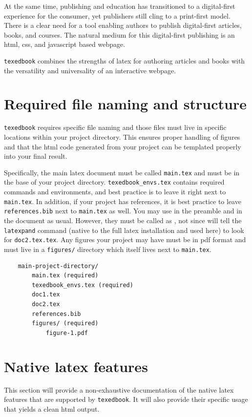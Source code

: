 \documentclass{article}
\begin{document}
At the same time, publishing and education has transitioned to a digital-first experience for the consumer, yet publishers still cling to a print-first model. There is a clear need for a tool enabling authors to publish digital-first articles, books, and courses. The natural medium for this digital-first publishing is an html, css, and javascript based webpage. 

\verb'texedbook' combines the strengths of latex for authoring articles and books with the versatility and universality of an interactive webpage.  

\section{Required file naming and structure}
\verb'texedbook' requires specific file naming and those files must live in specific locations within your project directory. This ensures proper handling of figures and that the html code generated from your project can be templated properly into your final result. 

Specifically, the main latex document must be called \verb'main.tex' and must be in the base of your project directory. \verb'texedbook_envs.tex' contains required commands and environments, and best practice is to leave it right next to \verb'main.tex'. In addition, if your project has references, it is best practice to leave \verb'references.bib' next to \verb'main.tex' as well. You may use \verb'' in the preamble and \verb'' in the document as usual. However, they must be called as \verb'', not \verb'' since will tell the \verb'latexpand' command (native to the full latex installation and used here) to look for \verb'doc2.tex.tex'.  Any figures your project may have must be in pdf format and must live in a \verb'figures/' directory which itself lives next to \verb'main.tex'.  

\begin{verbatim}
    main-project-directory/
        main.tex (required)
        texedbook_envs.tex (required)
        doc1.tex
        doc2.tex
        references.bib
        figures/ (required)
            figure-1.pdf
\end{verbatim}


\section{Native latex features} \label{sec:latexfeatures}
This section will provide a non-exhaustive documentation of the native latex features that are supported by \verb'texedbook'. It will also provide their specific usage that yields a clean html output.
\end{document}
